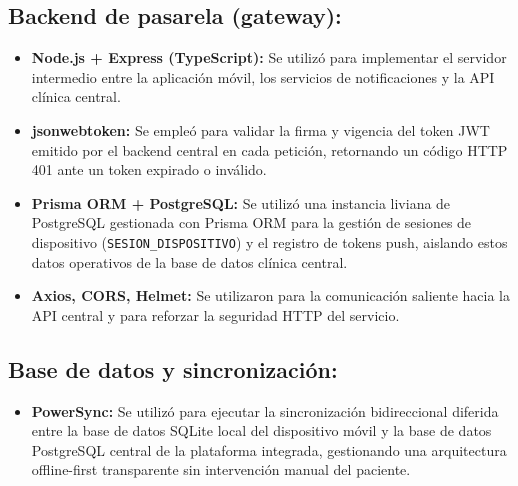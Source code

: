\subsection*{Backend de pasarela (gateway):}
\begin{itemize}
    \item \textbf{Node.js + Express (TypeScript):} Se utilizó para implementar el servidor intermedio entre la aplicación móvil, los servicios de notificaciones y la API clínica central.
    \item \textbf{jsonwebtoken:} Se empleó para validar la firma y vigencia del token JWT emitido por el backend central en cada petición, retornando un código HTTP 401 ante un token expirado o inválido.
    \item \textbf{Prisma ORM + PostgreSQL:} Se utilizó una instancia liviana de PostgreSQL gestionada con Prisma ORM para la gestión de sesiones de dispositivo (\texttt{SESION\_DISPOSITIVO}) y el registro de tokens push, aislando estos datos operativos de la base de datos clínica central.
    \item \textbf{Axios, CORS, Helmet:} Se utilizaron para la comunicación saliente hacia la API central y para reforzar la seguridad HTTP del servicio.
\end{itemize}

\subsection*{Base de datos y sincronización:}
\begin{itemize}
    \item \textbf{PowerSync:} Se utilizó para ejecutar la sincronización bidireccional diferida entre la base de datos SQLite local del dispositivo móvil y la base de datos PostgreSQL central de la plataforma integrada, gestionando una arquitectura offline-first transparente sin intervención manual del paciente.
\end{itemize}

